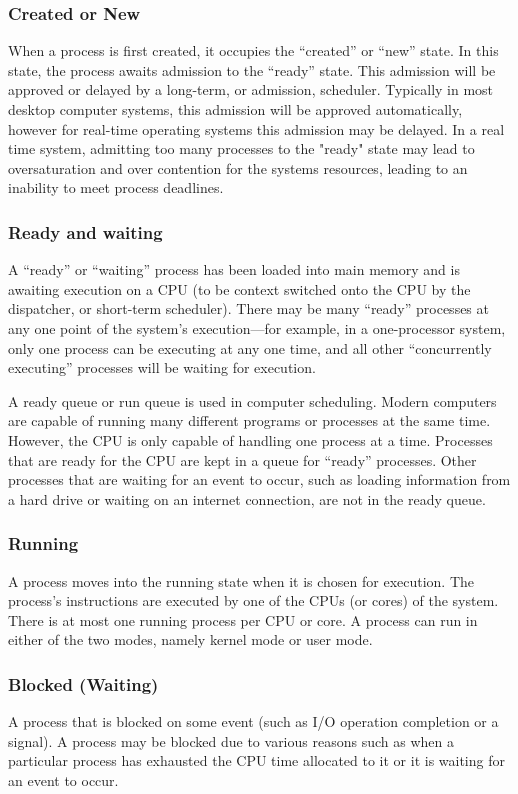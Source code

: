 \documentclass[a4paper, twoside]{article}
\begin{document}
\subsubsection{Created or New}
When a process is first created, it occupies the ``created'' or ``new'' state. In this state, the process awaits admission to the ``ready'' state. This admission will be approved or delayed by a long-term, or admission, scheduler. Typically in most desktop computer systems, this admission will be approved automatically, however for real-time operating systems this admission may be delayed. In a real time system, admitting too many processes to the "ready" state may lead to oversaturation and over contention for the systems resources, leading to an inability to meet process deadlines.

\subsubsection{Ready and waiting}
A ``ready'' or ``waiting'' process has been loaded into main memory and is awaiting execution on a CPU (to be context switched onto the CPU by the dispatcher, or short-term scheduler). There may be many ``ready'' processes at any one point of the system's execution—for example, in a one-processor system, only one process can be executing at any one time, and all other ``concurrently executing'' processes will be waiting for execution.

A ready queue or run queue is used in computer scheduling. Modern computers are capable of running many different programs or processes at the same time. However, the CPU is only capable of handling one process at a time. Processes that are ready for the CPU are kept in a queue for ``ready'' processes. Other processes that are waiting for an event to occur, such as loading information from a hard drive or waiting on an internet connection, are not in the ready queue.

\subsubsection{Running}
A process moves into the running state when it is chosen for execution. The process's instructions are executed by one of the CPUs (or cores) of the system. There is at most one running process per CPU or core. A process can run in either of the two modes, namely kernel mode or user mode.

\subsubsection{Blocked (Waiting)}
A process that is blocked on some event (such as I/O operation completion or a signal). A process may be blocked due to various reasons such as when a particular process has exhausted the CPU time allocated to it or it is waiting for an event to occur.
\end{document}
